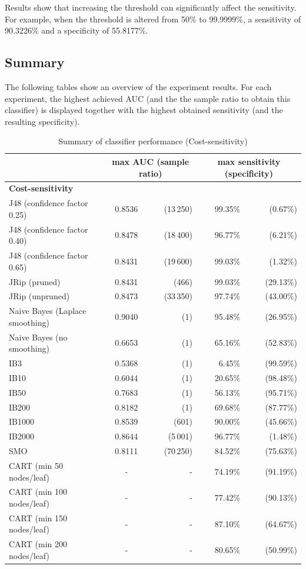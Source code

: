 Results show that increasing the threshold can significantly affect the sensitivity. For example, when the threshold is altered from 50\% to 99.9999\%, a sensitivity of 90.3226\% and a specificity of 55.8177\%.


\newpage
\subsection{Summary}\label{exp-summary}
The following tables show an overview of the experiment results. For each experiment, the highest achieved AUC (and the the sample ratio to obtain this classifier) is displayed together with the highest obtained sensitivity (and the resulting specificity).

\begin{table}[h]
\centering  
\begin{tabular}{ l | c r | r r|}                                      
& \multicolumn{2}{c}{max AUC (sample ratio)} & \multicolumn{2}{c}{max sensitivity (specificity)} \\
\hline 
\multicolumn{5}{l}{\textbf{Cost-sensitivity}}\\
\hline
J48 (confidence factor 0.25) & 0.8536 & (13\,250) & 99.35\% & (0.67\%)\\
J48 (confidence factor 0.40) & 0.8478 & (18\,400) & 96.77\% & (6.21\%)\\
J48 (confidence factor 0.65) & 0.8431 & (19\,600) & 99.03\% & (1.32\%)\\
JRip (pruned) & 0.8431 & (466) & 99.03\% & (29.13\%)\\
JRip (unpruned) & 0.8473 & (33\,350) & 97.74\% & (43.00\%)\\
Naive Bayes (Laplace smoothing) & 0.9040 & (1) & 95.48\% & (26.95\%)\\
Naive Bayes (no smoothing) & 0.6653 & (1) & 65.16\% & (52.83\%)\\
IB3 & 0.5368 & (1) & 6.45\% & (99.59\%)\\
IB10 & 0.6044 & (1) & 20.65\% & (98.48\%)\\
IB50 & 0.7683 & (1) & 56.13\% & (95.71\%)\\
IB200 & 0.8182 & (1) & 69.68\% & (87.77\%)\\
IB1000 & 0.8539 & (601) & 90.00\% & (45.66\%)\\
IB2000 & 0.8644 & (5\,001) & 96.77\% & (1.48\%)\\
SMO & 0.8111 & (70\,250) & 84.52\% & (75.63\%)\\
CART (min 50 nodes/leaf) & - & - & 74.19\% & (91.19\%)\\
CART (min 100 nodes/leaf) & - & - & 77.42\% & (90.13\%)\\
CART (min 150 nodes/leaf) & - & - & 87.10\% & (64.67\%)\\
CART (min 200 nodes/leaf) & - & - & 80.65\% & (50.99\%)\\
\hline                          %
\end{tabular}
\label{tab:CostSens}
\caption{Summary of classifier performance (Cost-sensitivity)} %
\end{table}

